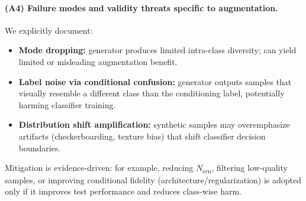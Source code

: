 \paragraph{(A4) Failure modes and validity threats specific to augmentation.}
We explicitly document:
\begin{itemize}
  \item \textbf{Mode dropping:} generator produces limited intra-class diversity; can yield limited or misleading augmentation benefit.
  \item \textbf{Label noise via conditional confusion:} generator outputs samples that visually resemble a different class than the conditioning label, potentially harming classifier training.
  \item \textbf{Distribution shift amplification:} synthetic samples may overemphasize artifacts (checkerboarding, texture bias) that shift classifier decision boundaries.
\end{itemize}
Mitigation is evidence-driven: for example, reducing $N_{\mathrm{syn}}$, filtering low-quality samples, or improving conditional fidelity (architecture/regularization) is adopted only if it improves test performance and reduces class-wise harm.
